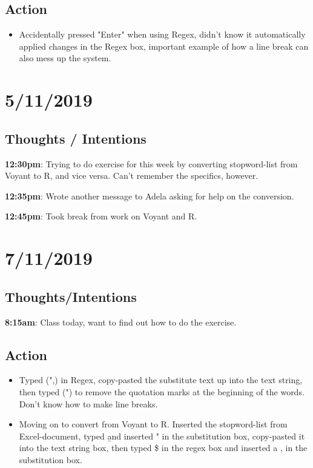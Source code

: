 \documentclass{article}
\begin{document}
\subsection{Action}

\begin{itemize}
\item Accidentally pressed "Enter" when using Regex, didn't know it automatically applied changes in the Regex box, important example of how a line break can also mess up the system.
\end{itemize}

\section{5/11/2019}
\subsection{Thoughts / Intentions}

\textbf {12:30pm}: Trying to do exercise for this week by converting stopword-list from Voyant to R, and vice versa. Can't remember the specifics, however.


\textbf{12:35pm}: Wrote another message to Adela asking for help on the conversion.


\textbf{12:45pm}: Took break from work on Voyant and R.

\section{7/11/2019}

\subsection{Thoughts/Intentions}

\textbf{8:15am}: Class today, want to find out how to do the exercise.

\subsection{Action}

\begin{itemize}
    \item Typed (",) in Regex, copy-pasted the substitute text up into the text string, then typed (") to remove the quotation marks at the beginning of the words. Don't know how to make line breaks.
    \item Moving on to convert from Voyant to R. Inserted the stopword-list from Excel-document, typed \b and inserted " in the substitution box, copy-pasted it into the text string box, then typed \$ in the regex box and inserted a , in the substitution box.
\end{itemize}
\end{document}
